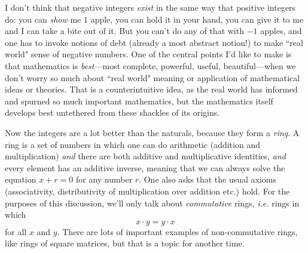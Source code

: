 \documentclass[11pt,oneside]{amsart}
\begin{document}
I don't think that negative integers {\em exist} in the same way that positive integers do: you can {\em show} me $1$ apple, you can hold it in your hand,
you can give it to me and I can take a bite out of it.  But you can't do any of that with $-1$ apples, and one has to invoke notions of debt (already a most abstract notion!) to make ``real world" sense of negative numbers. One of the central points I'd like to make is that mathematics is {\em best}---most complete, powerful, useful, beautiful---when we don't worry so much about ``real world" meaning or application of mathematical ideas or theories.  That is a counterintuitive idea, 
as the real world has informed and spurned so much important mathematics, but the mathematics itself develops best untethered from these shackles of its origins.

Now the integers are a lot better than the naturals, because they form a {\em ring}.  A ring is a set of numbers in which one can do arithmetic
(addition and multiplication) {\em and} there are both additive and multiplicative identities, {\em and} every element has an additive inverse,
meaning that we can always solve the equation $x+r = 0$ for any number $r$.  One also asks that the usual axioms (associativity, distributivity of
multiplication over addition etc.) hold.  
For the purposes of this discussion, we'll only talk about {\em commutative} rings, 
{\em i.e.} rings in which
$$x\cdot y = y\cdot x$$
for all $x$ and $y$.  There are lots of important examples of non-commutative rings, like rings of square matrices, but that is a topic for another time.
\end{document}
